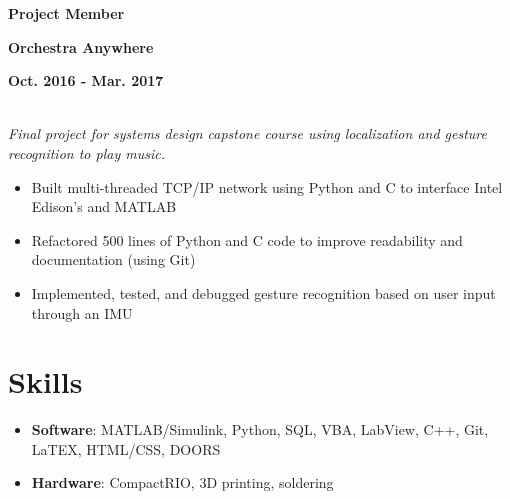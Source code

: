 \documentclass[12pt]{article}
\newcommand\textbox[1]{\parbox{.333\textwidth}{#1}}
\newcommand{\textlcr}[3]{\textbox{\textbf{#1}\hfill}\textbox{\hfil \textbf{#2}\hfil}\textbox{\hfill \textbf{#3}}}
\begin{document}
\textlcr{Project Member}{Orchestra Anywhere}{Oct. 2016 - Mar. 2017}
\\ \textit{Final project for systems design capstone course using localization and gesture recognition to play music.}
\begin{itemize}
\item Built multi-threaded TCP/IP network using Python and C to interface Intel Edison's and MATLAB
\item Refactored 500 lines of Python and C code to improve readability and documentation (using Git)
\item Implemented, tested, and debugged gesture recognition based on user input through an IMU
\end{itemize}

\section*{Skills}
\vspace*{-1em}\makebox[\linewidth]{\rule{\textwidth}{0.4pt}}
\begin{itemize}
\item \textbf{Software}: MATLAB/Simulink, Python, SQL, VBA, LabView, C++, Git, LaTEX, HTML/CSS, DOORS
\item \textbf{Hardware}: CompactRIO, 3D printing, soldering
\end{itemize}
\end{document}

